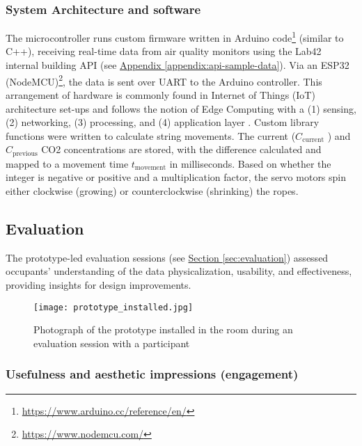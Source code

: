 \subsubsection{System Architecture and software}

The microcontroller runs custom firmware written in Arduino code\footnote{\url{https://www.arduino.cc/reference/en/}} (similar to C++), receiving real-time data from air quality monitors using the Lab42 internal building API (see \hyperref[appendix:api-sample-data]{Appendix \ref*{appendix:api-sample-data}}). Via an ESP32 (NodeMCU)\footnote{\url{https://www.nodemcu.com/}}, the data is sent over UART to the Arduino controller. This arrangement of hardware is commonly found in Internet of Things (IoT) architecture set-ups and follows the notion of Edge Computing with a (1) sensing, (2) networking, (3) processing, and (4) application layer \cite{li_edge-oriented_2019, idrees_edge_2018}. Custom library functions were written to calculate string movements. The current (\( C_{\text{current}} \) ) and \( C_{\text{previous}} \) CO2 concentrations are stored, with the difference calculated and mapped to a movement time \( t_{\text{movement}} \) in milliseconds. Based on whether the integer is negative or positive and a multiplication factor, the servo motors spin either clockwise (growing) or counterclockwise (shrinking) the ropes.


\subsection{Evaluation}
\label{sec:evaluation_results}

The prototype-led evaluation sessions (see \hyperref[sec:evaluation]{Section \ref*{sec:evaluation}}) assessed occupants' understanding of the data physicalization, usability, and effectiveness, providing insights for design improvements.


\begin{figure}[b]
    \centering
    \texttt{[image: prototype\_installed.jpg]}
    \caption{Photograph of the prototype installed in the room during an evaluation session with a participant }
    \label{fig:photograph-prototype}
\end{figure}

\subsubsection{Usefulness and aesthetic impressions (engagement)}

